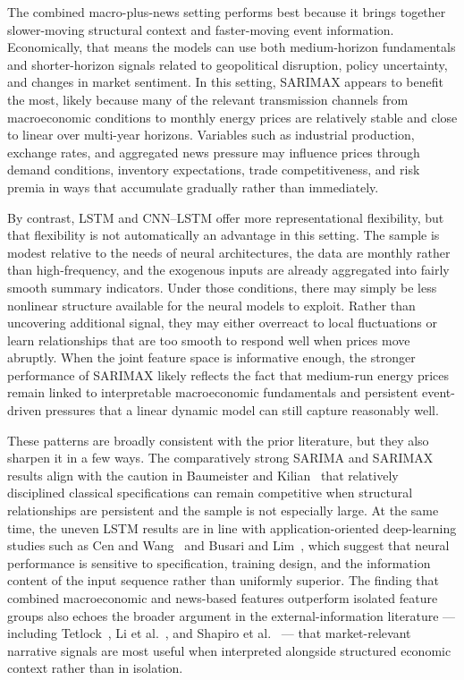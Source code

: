 \documentclass[pdflatex,sn-mathphys-num]{sn-jnl}%
\theoremstyle{thmstyleone}%
\theoremstyle{thmstyletwo}%
\theoremstyle{thmstylethree}%
\begin{document}
The combined macro-plus-news setting performs best because it brings together slower-moving structural context and faster-moving event information. Economically, that means the models can use both medium-horizon fundamentals and shorter-horizon signals related to geopolitical disruption, policy uncertainty, and changes in market sentiment. In this setting, SARIMAX appears to benefit the most, likely because many of the relevant transmission channels from macroeconomic conditions to monthly energy prices are relatively stable and close to linear over multi-year horizons. Variables such as industrial production, exchange rates, and aggregated news pressure may influence prices through demand conditions, inventory expectations, trade competitiveness, and risk premia in ways that accumulate gradually rather than immediately.

By contrast, LSTM and CNN--LSTM offer more representational flexibility, but that flexibility is not automatically an advantage in this setting. The sample is modest relative to the needs of neural architectures, the data are monthly rather than high-frequency, and the exogenous inputs are already aggregated into fairly smooth summary indicators. Under those conditions, there may simply be less nonlinear structure available for the neural models to exploit. Rather than uncovering additional signal, they may either overreact to local fluctuations or learn relationships that are too smooth to respond well when prices move abruptly. When the joint feature space is informative enough, the stronger performance of SARIMAX likely reflects the fact that medium-run energy prices remain linked to interpretable macroeconomic fundamentals and persistent event-driven pressures that a linear dynamic model can still capture reasonably well.

These patterns are broadly consistent with the prior literature, but they also sharpen it in a few ways. The comparatively strong SARIMA and SARIMAX results align with the caution in Baumeister and Kilian~\cite{baumeister2016} that relatively disciplined classical specifications can remain competitive when structural relationships are persistent and the sample is not especially large. At the same time, the uneven LSTM results are in line with application-oriented deep-learning studies such as Cen and Wang~\cite{cen2019} and Busari and Lim~\cite{busari2021}, which suggest that neural performance is sensitive to specification, training design, and the information content of the input sequence rather than uniformly superior. The finding that combined macroeconomic and news-based features outperform isolated feature groups also echoes the broader argument in the external-information literature --- including Tetlock~\cite{tetlock2007}, Li et al.~\cite{li2014}, and Shapiro et al.~\cite{shapiro2022} --- that market-relevant narrative signals are most useful when interpreted alongside structured economic context rather than in isolation.
\end{document}
